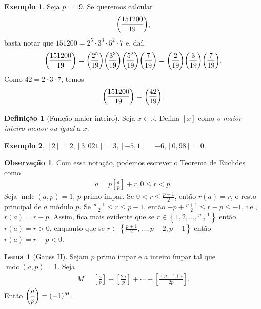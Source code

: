 \documentclass[a4paper,11pt,twoside, leqno]{article}
\DeclareMathOperator{\mdc}{mdc}
\newcommand{\genlegendre}[4]{%
	\genfrac{(}{)}{}{#1}{#3}{#4}%
	\if\relax\detokenize{#2}\relax\else_{\!#2}\fi
}
\newcommand{\legendre}[3][]{\genlegendre{}{#1}{#2}{#3}}
\theoremstyle{definition}
\newtheorem*{definition}{Definição}
\newtheorem{lemma}[theorem]{Lema}
\newtheorem{remark}{Observação}[section]
\newtheorem*{example}{Exemplo}
\begin{document}
\begin{example}
	Seja $p=19$. Se queremos calcular
	\begin{align*}
	\legendre[]{151200}{19},
	\end{align*}
	basta notar que $151200 = 2^5\cdot 3^3\cdot 5^2\cdot 7$ e, daí,
	\begin{align*}
	\legendre[]{151200}{19} = \legendre[]{2^5}{19}\legendre[]{3^3}{19}\legendre[]{5^2}{19}\legendre[]{7}{19} = \legendre[]{2}{19}\legendre[]{3}{19}\legendre[]{7}{19}.
	\end{align*}
	Como $42 = 2\cdot 3\cdot 7$, temos
	\begin{align*}
	\legendre[]{151200}{19} = \legendre[]{42}{19}.
	\end{align*}
\end{example}
\begin{definition}[Função maior inteiro]
	Seja $x\in\mathbb{R}$. Defina $[x]$ como {\em o maior inteiro menor ou igual} a $x$.
\end{definition}
\begin{example}
	$[2] = 2, [3,021] = 3, [-5,1] = -6, [0,98] = 0$.
\end{example}
\begin{remark}
	Com essa notação, podemos escrever o Teorema de Euclides como
	\begin{align*}
	a = p\left[ \frac{a}{p} \right] + r, 0\leq r < p.
	\end{align*}
	Seja $\mdc(a,p) = 1$, $p$ primo ímpar. Se $\displaystyle{ 0 < r\leq\frac{p-1}{2}}$, então $r(a) = r$, o resto principal de $a$ módulo $p$. Se $\displaystyle{ \frac{p+1}{2}\leq r\leq p-1 }$, então $\displaystyle{-p + \frac{p+1}{2}\leq r-p\leq -1}$, i.e., $r(a) = r-p$. Assim, fica mais evidente que se $\displaystyle{ r\in\left\{ 1,2,\dots, \frac{p-1}{2} \right\}}$ então $r(a) = r > 0$, enquanto que se $\displaystyle{ r\in\left\{ \frac{p+1}{2}, \dots, p-2, p-1 \right\}}$ então $r(a) = r-p < 0$.
\end{remark}
\begin{lemma}[Gauss II]
	Sejam $p$ primo ímpar e $a$ inteiro ímpar tal que $\mdc(a,p) =1$. Seja
	\begin{align*}
	M = \left[ \frac{a}{p} \right] + \left[ \frac{2a}{p} \right] + \cdots + \left[ \frac{(p-1)a}{2p} \right].
	\end{align*}
	Então $\displaystyle{ \legendre[]{a}{p} = (-1)^M }$.
\end{lemma}
\end{document}
